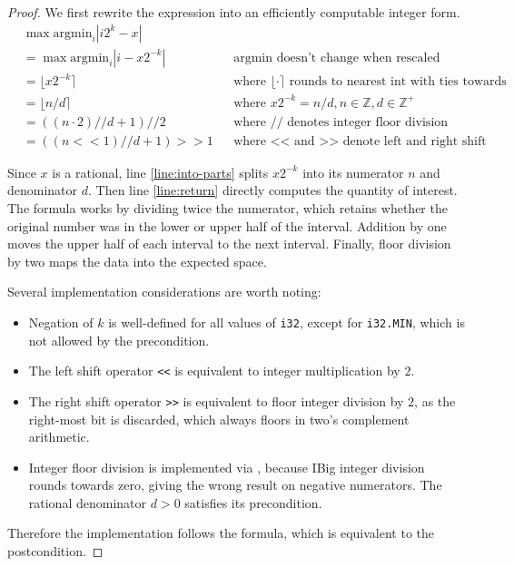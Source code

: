 \documentclass{article}
\begin{document}
\begin{proof}
    We first rewrite the expression into an efficiently computable integer form.
    \begin{align}
        &\max \mathrm{argmin}_i |i 2^k - x| \\
        &= \max \mathrm{argmin}_i |i - x 2^{-k}| &&\text{argmin doesn't change when rescaled}\\
        &= \lfloor x 2^{-k}\rceil &&\text{where } \lfloor \cdot \rceil \text{ rounds to nearest int with ties towards infinity} \\
        &= \lfloor n / d \rceil &&\text{where } x 2^{-k} = n / d, n \in \mathbb{Z}, d \in \mathbb{Z}^+ \\
        &= ((n \cdot 2) // d + 1) // 2 &&\text{where // denotes integer floor division} \\
        &= ((n << 1) // d + 1) >> 1 &&\text{where <{}< and >{}> denote left and right shift}
    \end{align}

    Since $x$ is a rational, line \ref{line:into-parts} splits $x 2^{-k}$ into its numerator $n$ and denominator $d$.
    Then line \ref{line:return} directly computes the quantity of interest.
    The formula works by dividing twice the numerator, which retains whether the original number was in the lower or upper half of the interval.
    Addition by one moves the upper half of each interval to the next interval.
    Finally, floor division by two maps the data into the expected space.

    Several implementation considerations are worth noting:
    \begin{itemize}
        \item Negation of $k$ is well-defined for all values of \texttt{i32},
            except for \texttt{i32.MIN}, which is not allowed by the precondition.
        \item The left shift operator \texttt{<{}<} is equivalent to integer multiplication by $2$.
        \item The right shift operator \texttt{>{}>} is equivalent to floor integer division by $2$,
            as the right-most bit is discarded, which always floors in two's complement arithmetic.
        \item Integer floor division is implemented via ,
            because IBig integer division rounds towards zero, giving the wrong result on negative numerators. The rational denominator $d>0$ satisfies its precondition.
    \end{itemize}

    Therefore the implementation follows the formula, which is equivalent to the postcondition.
\end{proof}
\end{document}
